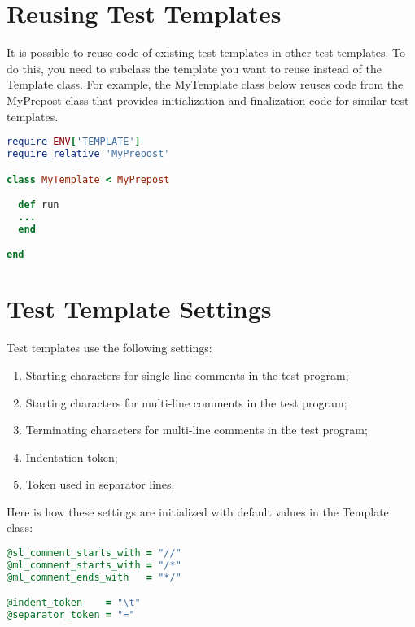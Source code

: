 \documentclass[oneside,final,14pt]{extreport}
\begin{document}

\section{Reusing Test Templates}

It is possible to reuse code of existing test templates in other test templates.
To do this, you need to subclass the template you want to reuse instead of the
Template class. For example, the MyTemplate class below reuses code from the
MyPrepost class that provides initialization and finalization code for similar
test templates.

\begin{lstlisting}[language=ruby]
require ENV['TEMPLATE']
require_relative 'MyPrepost'

class MyTemplate < MyPrepost

  def run
  ... 
  end

end
\end{lstlisting}


\section{Test Template Settings}

Test templates use the following settings:

\begin{enumerate}
  \item Starting characters for single-line comments in the test program;
  \item Starting characters for multi-line comments in the test program;
  \item Terminating characters for multi-line comments in the test program;
  \item Indentation token;
  \item Token used in separator lines.
\end{enumerate}

Here is how these settings are initialized with default values in the Template class:

\begin{lstlisting}[language=ruby]
@sl_comment_starts_with = "//"
@ml_comment_starts_with = "/*"
@ml_comment_ends_with   = "*/"

@indent_token    = "\t"
@separator_token = "="
\end{lstlisting}
\end{document}
